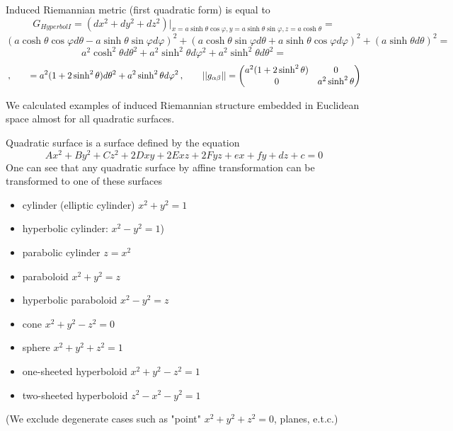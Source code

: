 \documentclass[12pt]{article}
\theoremstyle{theorem}
\numberwithin{equation}{section}
\begin{document}
Induced Riemannian metric (first quadratic form) is equal to
              $$
              G_{Hyperbol I}=\left(dx^2+dy^2+dz^2\right)\big\vert_{x=a\sinh\theta\cos\varphi,y=a\sinh\theta\sin\varphi,
              z=a\cosh\theta}=
                      $$
                      $$
                      (a\cosh\theta\cos\varphi d\theta-a\sinh\theta\sin\varphi d\varphi)^2+
                      (a\cosh\theta\sin\varphi d\theta+a\sinh\theta\cos\varphi d\varphi)^2+
                         (a\sinh\theta d\theta)^2=
                      $$
                      $$
          a^2\cosh^2\theta d\theta^2+a^2\sinh^2\theta d\varphi^2+a^2\sinh^2\theta d\theta^2=
                      $$
        \begin{equation}\label{firtsquadraticformforsphere(diff)}\,,\qquad
             =a^2(1+2\sinh^2\theta)d\theta^2+a^2\sinh^2\theta d\varphi^2\,,\qquad
                        ||g_{\alpha\beta}||=
   \begin{pmatrix}
   a^2(1+2\sinh^2\theta) & 0 \\
   0&  a^2\sinh^2\theta \\
   \end{pmatrix}
\end{equation}


\m
{\footnotesize
  We calculated examples of induced Riemannian structure embedded in Euclidean space almost for all quadratic surfaces.

Quadratic surface is a surface defined by the equation
              $$
             Ax^2+By^2+Cz^2+2Dxy+2Exz+2Fyz+ex+fy+dz+c=0
              $$
One can see that any quadratic surface by affine transformation can be transformed to one of these surfaces

  \begin{itemize}
  \item  cylinder (elliptic cylinder) $x^2+y^2=1$

  \item  hyperbolic cylinder: $x^2-y^2=1$)

  \item  parabolic cylinder  $z=x^2$

  \item  paraboloid   $x^2+y^2=z$

  \item      hyperbolic paraboloid $x^2-y^2=z$

  \item  cone $x^2+y^2-z^2=0$

  \item  sphere $x^2+y^2+z^2=1$

  \item  one-sheeted hyperboloid  $x^2+y^2-z^2=1$

  \item   two-sheeted hyperboloid   $z^2-x^2-y^2=1$

  \end{itemize}
(We exclude degenerate cases such as "point" $x^2+y^2+z^2=0$, planes, e.t.c.)
}
\end{document}

